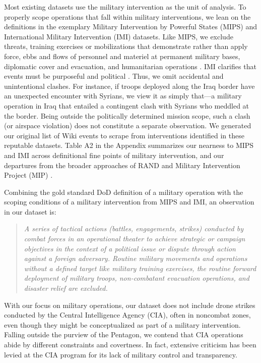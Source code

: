 \documentclass[fleqn,12pt]{article}
\begin{document}
Most existing datasets use the military intervention as the unit of analysis. To properly scope operations that fall within military interventions, we lean on the definitions in the exemplary Military Intervention by Powerful States (MIPS) and International Military Intervention (IMI) datasets. Like MIPS, we exclude threats, training exercises or mobilizations that demonstrate rather than apply force, ebbs and flows of personnel and materiel at permanent military bases, diplomatic cover and evacuation, and humanitarian operations \citep{sullivan_militaryinterventionpowerful_2009}. IMI clarifies that events must be purposeful and political \citep{pearson_internationalmilitaryintervention_1993, kisangani_internationalmilitaryintervention_2008}. Thus, we omit accidental and unintentional clashes. For instance, if troops deployed along the Iraq border have an unexpected encounter with Syrians, we view it as simply that—a military operation in Iraq that entailed a contingent clash with Syrians who meddled at the border. Being outside the politically determined mission scope, such a clash (or airspace violation) does not constitute a separate observation. We generated our original list of Wiki events to scrape from interventions identified in these reputable datasets. Table A2 in the Appendix summarizes our nearness to MIPS and IMI across definitional fine points of military intervention, and our departures from the broader approaches of RAND \citep{kavanagh_characteristicssuccessfulmilitary_2019} and Military Intervention Project (MIP) \citep{kushi_introducingmilitaryintervention_2022}. 

Combining the gold standard DoD definition of a military operation with the scoping conditions of a military intervention from MIPS and IMI, an observation in our dataset is:

    \begin{quote}\singlespacing
    \textit{A series of tactical actions (battles, engagements, strikes) conducted by combat forces in an operational theater to achieve strategic or campaign objectives in the context of a political issue or dispute through action against a foreign adversary. Routine military movements and operations without a defined target like military training exercises, the routine forward deployment of military troops, non-combatant evacuation operations, and disaster relief are excluded.}
    \end{quote}

With our focus on military operations, our dataset does not include drone strikes conducted by the Central Intelligence Agency (CIA), often in noncombat zones, even though they might be conceptualized as part of a military intervention. Falling outside the purview of the Pentagon, we contend that CIA operations abide by different constraints and covertness. In fact, extensive criticism has been levied at the CIA program for its lack of military control and transparency. 
\end{document}
